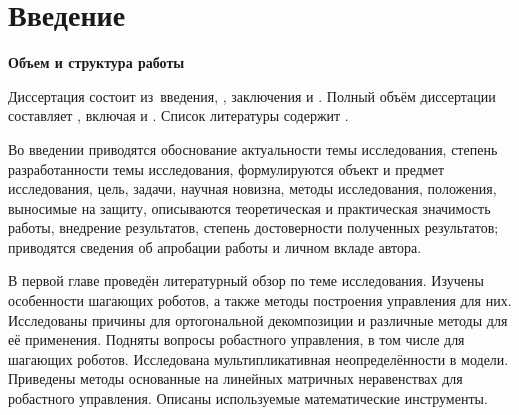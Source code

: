 \chapter*{Введение}                         %

\newcommand{\actuality}{\textbf{\actualityTXT}}
\newcommand{\progress}{\textbf{\progressTXT}}
\newcommand{\objectsubject}{\textbf{\objectsubjectTXT}}
\newcommand{\aimtasks}{\textbf{\aimtasksTXT}}
\newcommand{\methods}{\textbf{\methodsTXT}}
\newcommand{\defpositions}{\textbf{\defpositionsTXT}}
\newcommand{\compliances}{\textbf{\complianceTXT}}
\newcommand{\novelty}{\textbf{\noveltyTXT}}
\newcommand{\probation}{\textbf{\probationTXT}}
\newcommand{\influence}{\textbf{\influenceTXT}}
\newcommand{\reliability}{\textbf{\reliabilityTXT}}
\newcommand{\publications}{\textbf{\publicationsTXT}}
\newcommand{\contribution}{\textbf{\contributionTXT}}


\textbf{Объем и структура работы} 

Диссертация состоит из~введения,
,
заключения и
.
%
Полный объём диссертации составляет
, включая
 и
.
Список литературы содержит
.

Во введении приводятся обоснование актуальности темы исследования, степень разработанности темы исследования, формулируются объект и предмет исследования, цель, задачи, научная новизна, методы исследования, положения, выносимые на защиту, описываются теоретическая и практическая значимость работы, внедрение результатов, степень достоверности полученных результатов; приводятся сведения об апробации работы и личном вкладе автора.

В первой главе проведён литературный обзор по теме исследования. Изучены особенности шагающих роботов, а также методы построения управления для них. Исследованы причины для ортогональной декомпозиции и различные методы для её применения. Подняты вопросы робастного управления, в том числе для шагающих роботов. Исследована мультипликативная неопределённости в модели. Приведены методы основанные на линейных матричных неравенствах для робастного управления. Описаны используемые математические инструменты.

